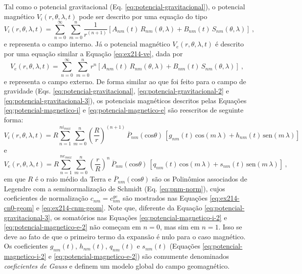 \documentclass[10pt,a4paper,fleqn]{article}
\begin{document}
Tal como o potencial gravitacional (Eq. \ref{eq:potencial-gravitacional}),
o potencial magn\'{e}tico $V_{i}(r, \theta, \lambda, t)$ pode ser descrito
por uma equa\c{c}\~{a}o do tipo
\begin{equation}
V_{i}(r, \theta, \lambda, t) = \sum_{n=0}^{\infty} \, \sum_{m=0}^{n} 
\frac{1}{r^{(n+1)}} \left[ 
A_{nm}(t) \, R_{nm}(\theta, \lambda) +
B_{nm}(t) \, S_{nm}(\theta, \lambda)
\right] \: ,
\label{eq:potencial-magnetico-i}
\end{equation}
e representa o campo interno.
Já o potencial magn\'{e}tico $V_{e}(r, \theta, \lambda, t)$ \'{e} descrito
por uma equa\c{c}\~{a}o similar a Equa\c{c}\~{a}o \ref{eq:ex214-ve},
dada por
\begin{equation}
V_{e}(r, \theta, \lambda, t) = \sum_{n=0}^{\infty} \, \sum_{m=0}^{n} 
r^{n} \left[ 
A_{nm}(t) \, R_{nm}(\theta, \lambda) +
B_{nm}(t) \, S_{nm}(\theta, \lambda)
\right] \: ,
\label{eq:potencial-magnetico-e}
\end{equation}
e representa o campo externo.
De forma similar ao que foi feito para o campo de gravidade (Eqs. 
\ref{eq:potencial-gravitacional}, \ref{eq:potencial-gravitacional-2} e
\ref{eq:potencial-gravitacional-3}), os potenciais magn\'{e}ticos
descritos pelas Equa\c{c}\~{o}es \ref{eq:potencial-magnetico-i} e
\ref{eq:potencial-magnetico-e} s\~{a}o reescritos de seguinte forma:
\begin{equation}
V_{i}(r, \theta, \lambda, t) = R 
\sum_{n=1}^{ni_{max}} \sum_{m=0}^{n} 
\left(\frac{R}{r}\right)^{(n+1)} \, \overline{P}_{nm}(\text{cos}\theta) \, \left[ 
g_{nm}(t) \, \text{cos}(m \, \lambda) +
h_{nm}(t) \, \text{sen}(m \, \lambda)
\right]
\label{eq:potencial-magnetico-i-2}
\end{equation}
e
\begin{equation}
V_{e}(r, \theta, \lambda, t) = R 
\sum_{n=1}^{ne_{max}} \sum_{m=0}^{n} 
\left(\frac{r}{R}\right)^{n} \, \overline{P}_{nm}(\text{cos}\theta) \, \left[ 
q_{nm}(t) \, \text{cos}(m \, \lambda) +
s_{nm}(t) \, \text{sen}(m \, \lambda)
\right] \: ,
\label{eq:potencial-magnetico-e-2}
\end{equation}
em que $R$ \'{e} o raio m\'{e}dio da Terra e
$\overline{P}_{nm}(\text{cos}\theta)$ s\~{a}o os Polin\^{o}mios 
associados de Legendre com a 
seminormaliza\c{c}\~{a}o de Schmidt (Eq. \ref{eq:pnm-norm}), cujos
coeficientes de normaliza\c{c}\~{a}o $c_{nm} = c_{nm}^{ge}$ s\~{a}o 
mostrados nas Equa\c{c}\~{o}es \ref{eq:ex214-cn0-geom} e \ref{eq:ex214-cnm-geom}.
Note que, diferente da Equa\c{c}\~{a}o \ref{eq:potencial-gravitacional-3},
os somat\'{o}rios nas Equa\c{c}\~{o}es \ref{eq:potencial-magnetico-i-2}
e \ref{eq:potencial-magnetico-e-2}
n\~{a}o come\c{c}am em $n = 0$, mas sim em $n = 1$. Isso se deve
ao fato de que o primeiro termo da expans\~{a}o \'{e} nulo
para o caso magn\'{e}tico.
Os coeficientes $g_{nm}(t)$, $h_{nm}(t)$, $q_{nm}(t)$ e $s_{nm}(t)$ 
(Equa\c{c}\~{o}es \ref{eq:potencial-magnetico-i-2} e \ref{eq:potencial-magnetico-e-2}) 
s\~{a}o comumente denominados \textit{coeficientes de Gauss} e definem um modelo
global do campo geomagn\'{e}tico.
\end{document}
